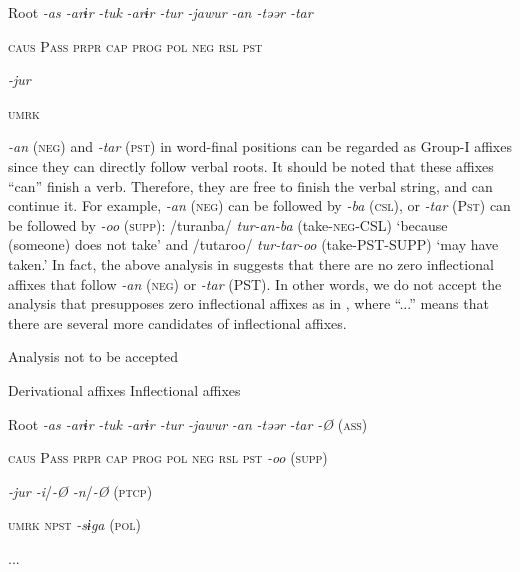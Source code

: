     Root  \textit{{}-as  {}-arɨr} %
\textit{{}-tuk}  \textit{{}-arɨr  {}-tur  {}-jawur} %
\textit{{}-an  {}-təər  {}-tar}

      \textsc{caus}  P\textsc{ass}  \textsc{prpr}  \textsc{cap}  \textsc{prog}  \textsc{pol}  \textsc{neg}  \textsc{rsl}  \textsc{pst}

            \textit{{}-jur} 

            \textsc{umrk}

\textit{{}-an} (\textsc{neg}) and \textit{{}-tar} (\textsc{pst}) in word-final positions can be regarded as Group-I affixes since they can directly follow verbal roots. It should be noted that these affixes “can” finish a verb. Therefore, they are free to finish the verbal string, and can continue it. For example, \textit{{}-an} (\textsc{neg}) can be followed by \textit{{}-ba} (\textsc{csl}), or \textit{{}-tar} (P\textsc{st}) can be followed by \textit{{}-oo} (\textsc{supp}): /turanba/ \textit{tur-an-ba} (take-\textsc{neg}-CSL) ‘because (someone) does not take’ and /tutaroo/ \textit{tur-tar-oo} (take-PST-SUPP) ‘may have taken.’ In fact, the above analysis in  suggests that there are no zero inflectional affixes that follow \textit{{}-an} (\textsc{neg}) or \textit{{}-tar} (PST). In other words, we do not accept the analysis that presupposes zero inflectional affixes as in , where “...” means that there are several more candidates of inflectional affixes.

\ea\label{ex:8-7}
  Analysis not to be accepted

    Derivational affixes  Inflectional affixes

  Root  \textit{{}-as  {}-arɨr} %
\textit{{}-tuk  {}-arɨr  {}-tur  {}-jawur} %
\textit{{}-an} %
\textit{{}-təər} %
\textit{{}-tar  {}-Ø} (\textsc{ass})

    \textsc{caus}  P\textsc{ass}  \textsc{prpr}  \textsc{cap}  \textsc{prog}  \textsc{pol}  \textsc{neg}  \textsc{rsl}  \textsc{pst}  \textit{{}-oo} (\textsc{supp})

          \textit{{}-jur    {}-i}/\textit{{}-Ø  {}-n}/\textit{{}-Ø} (\textsc{ptcp})

          \textsc{umrk}    \textsc{npst}  \textit{{}-sɨga} (\textsc{pol})

                ...


